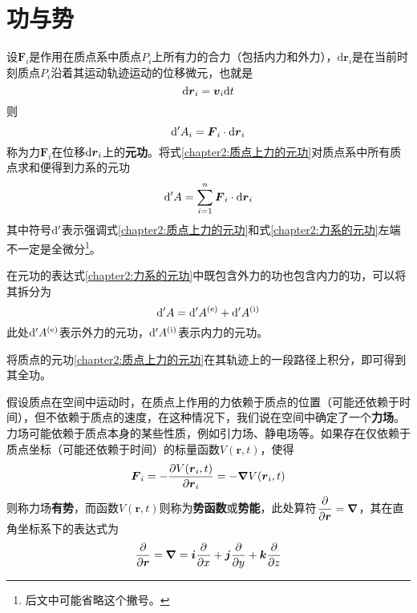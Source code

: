 \section{功与势}

设$\boldsymbol{F}_i$是作用在质点系中质点$P_i$上所有力的合力（包括内力和外力），$\mathrm{d}\boldsymbol{r}_i$是在当前时刻质点$P_i$沿着其运动轨迹运动的位移微元，也就是
\begin{equation}
	\mathrm{d} \boldsymbol{r}_i = \boldsymbol{v}_i\mathrm{d} t
\end{equation}
则
\begin{equation}
	\mathrm{d}'A_i = \boldsymbol{F}_i\cdot \mathrm{d}\boldsymbol{r}_i
	\label{chapter2:质点上力的元功}
\end{equation}
称为力$\boldsymbol{F}_i$在位移$\mathrm{d}\boldsymbol{r}_i$上的{\bf 元功}。将式\eqref{chapter2:质点上力的元功}对质点系中所有质点求和便得到力系的元功
\begin{equation}
	\mathrm{d}'A = \sum_{i=1}^n \boldsymbol{F}_i\cdot \mathrm{d} \boldsymbol{r}_i
	\label{chapter2:力系的元功}
\end{equation}
其中符号$\mathrm{d}'$表示强调式\eqref{chapter2:质点上力的元功}和式\eqref{chapter2:力系的元功}左端不一定是全微分\footnote{后文中可能省略这个撇号。}。

在元功的表达式\eqref{chapter2:力系的元功}中既包含外力的功也包含内力的功，可以将其拆分为
\begin{equation}
	\mathrm{d}'A = \mathrm{d}'A^{(\mathrm{e})} + \mathrm{d}'A^{(\mathrm{i})}
\end{equation}
此处$\mathrm{d}'A^{(\mathrm{e})}$表示外力的元功，$\mathrm{d}'A^{(\mathrm{i})}$表示内力的元功。

将质点的元功\eqref{chapter2:质点上力的元功}在其轨迹上的一段路径上积分，即可得到其全功。

假设质点在空间中运动时，在质点上作用的力依赖于质点的位置（可能还依赖于时间），但不依赖于质点的速度，在这种情况下，我们说在空间中确定了一个{\bf 力场}。力场可能依赖于质点本身的某些性质，例如引力场、静电场等。如果存在仅依赖于质点坐标（可能还依赖于时间）的标量函数$V(\boldsymbol{r},t)$，使得
\begin{equation}
	\boldsymbol{F}_i = -\frac{\partial V(\boldsymbol{r}_i,t)}{\partial \boldsymbol{r}_i} = -\boldsymbol{\nabla} V(\boldsymbol{r}_i, t)
\end{equation}
则称力场{\bf 有势}，而函数$V(\boldsymbol{r},t)$则称为{\bf 势函数}或{\bf 势能}，此处算符$\dfrac{\partial}{\partial \boldsymbol{r}} = \boldsymbol{\nabla}$，其在直角坐标系下的表达式为
\begin{equation}
	\dfrac{\partial}{\partial \boldsymbol{r}} = \boldsymbol{\nabla} = \boldsymbol{i}\frac{\partial}{\partial x} + \boldsymbol{j}\frac{\partial}{\partial y} + \boldsymbol{k}\frac{\partial}{\partial z}
\end{equation}

